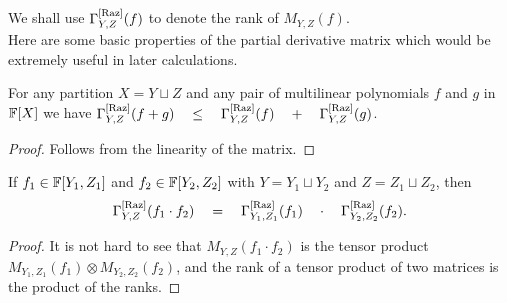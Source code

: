 
\noindent
We shall use $\Gamma^{\mathrm{[Raz]}}_{Y,Z}(f)$ to denote the rank of $M_{Y,Z}(f)$. \\


Here are some basic properties of the partial derivative matrix which would be extremely useful in later calculations.

\begin{observation}\label{obs:pdm-subadditivity}
	For any partition $X = Y \sqcup Z$ and any pair of multilinear 
	polynomials $f$ and $g$ in $\mathbb{F}[X]$ we have 
$\Gamma^{\mathrm{[Raz]}}_{Y,Z}(f+g) \quad \leq \quad \Gamma^{\mathrm{[Raz]}}_{Y,Z}(f) \quad + \quad \Gamma^{\mathrm{[Raz]}}_{Y,Z}(g)$.
\end{observation}
\begin{proof}
Follows from the linearity of the matrix. 
\end{proof}

\begin{observation}[Multiplicativity]\label{obs:pdm-multiplicativity}
If $f_1 \in \mathbb{F}[Y_1,Z_1]$ and $f_2 \in \mathbb{F}[Y_2, Z_2]$ with $Y = Y_1 \sqcup Y_2$ and $Z = Z_1 \sqcup Z_2$, then
$$
\Gamma^{\mathrm{[Raz]}}_{Y,Z}(f_1\cdot f_2) \quad = \quad \Gamma^{\mathrm{[Raz]}}_{Y_1, Z_1}(f_1) \quad \cdot \quad \Gamma^{\mathrm{[Raz]}}_{Y_2, Z_2}(f_2).
$$
\end{observation}
\begin{proof}
  It is not hard to see that $M_{Y,Z}(f_1\cdot f_2)$ is the tensor product $M_{Y_1, Z_1}(f_1) \otimes M_{Y_2, Z_2}(f_2)$, and the rank of a tensor product of two matrices is the product of the ranks.
\end{proof}

